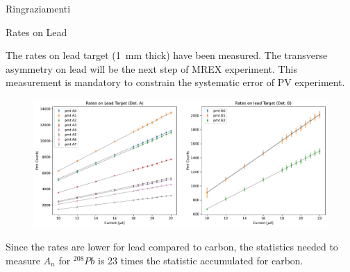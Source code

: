 \documentclass[9pt,a4paper]{beamer}
\begin{document}
\begin{frame}[noframenumbering]{Ringraziamenti}
\begin{center}
\end{center}
\end{frame}

\begin{frame}[noframenumbering]
\begin{center}
\end{center}
\end{frame}

\begin{frame}[noframenumbering]{Rates on Lead}

The rates on lead target (\SI{1}{\milli \meter} thick) have been measured. The transverse asymmetry on lead will be the next step of MREX experiment. This measurement is mandatory to constrain the systematic error of PV experiment.

\begin{figure}[hbtp]
\centering
\includegraphics[width = \textwidth]{figures/LeadRates.pdf}
\end{figure}

Since the rates are lower for lead compared to carbon, the statistics needed to measure $A_{n}$ for $^{208}Pb$ is 23 times the statistic accumulated for carbon.
\end{frame}
\end{document}
